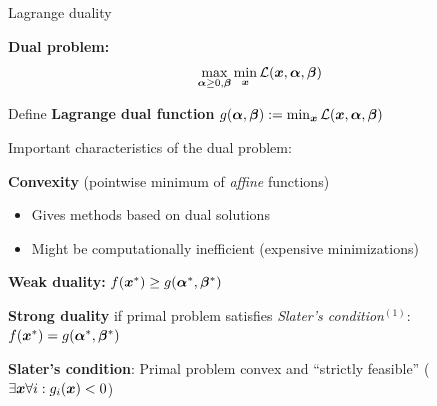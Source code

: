\documentclass[11pt,compress,t,notes=noshow, xcolor=table]{beamer}
\begin{document}
\begin{framei}[fs=small]{Lagrange duality}
\item \textbf{Dual problem:}
$$
\max_{\bm{\alpha} \ge 0, \bm{\beta}} \min_{\bm{x}}  \mathcal{L}(\bm{x}, \bm{\alpha}, \bm{\beta})
$$
\item Define \textbf{Lagrange dual function} $g(\bm{\alpha}, \bm{\beta}) := \min_{\bm{x}}  \mathcal{L}(\bm{x}, \bm{\alpha}, \bm{\beta})$
\vfill
\item Important characteristics of the dual problem:
\item \textbf{Convexity} (pointwise minimum of \textit{affine} functions)
\begin{itemize}
\item Gives methods based on dual solutions
\item Might be computationally inefficient (expensive minimizations)
\end{itemize}
\item \textbf{Weak duality:} $f(\bm{x}^\ast) \geq g(\bm{\alpha}^*, \bm{\beta}^*)$
\item \textbf{Strong duality} if primal problem satisfies \textit{Slater's condition}$^{(1)}$:\\
$f(\bm{x}^\ast) = g(\bm{\alpha}^*, \bm{\beta}^*)$
\vfill
\item[$^{(1)}$] \textbf{Slater's condition}: Primal problem convex and ``strictly feasible'' ($\exists \bm{x} \forall i: g_i(\bm{x}) < 0$)
\end{framei}

\endlecture
\end{document}
